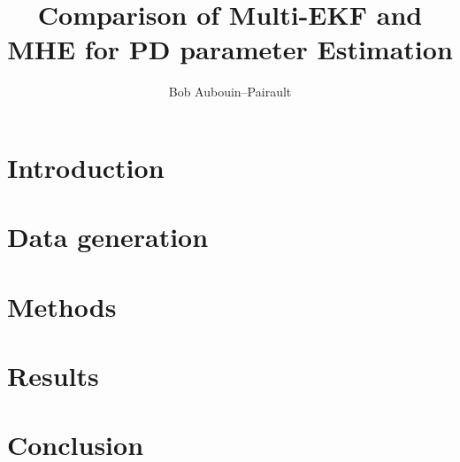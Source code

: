 \documentclass[a4paper,12pt]{article}
\begin{document}
\title{Comparison of Multi-EKF and MHE for PD parameter Estimation}

\author{Bob Aubouin--Pairault}
\maketitle

\section{Introduction}


\section{Data generation}


\section{Methods}


\section{Results}


\section{Conclusion}



\end{document}
